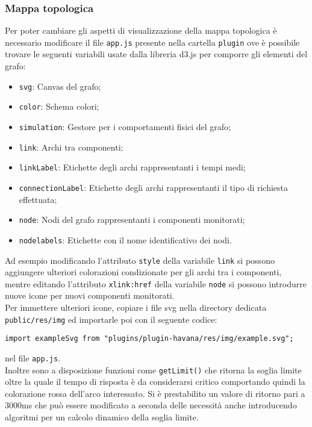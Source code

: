 \subsubsection{Mappa topologica}
\label{sec:graph}
Per poter cambiare gli aspetti di visualizzazione della mappa topologica è necessario modificare il file \texttt{app.js} presente nella cartella \texttt{plugin} ove è possibile trovare le seguenti variabili usate dalla libreria d3.js per comporre gli elementi del grafo:
\begin{itemize}
	\item \texttt{svg}: Canvas del grafo;
	\item \texttt{color}: Schema colori;
	\item \texttt{simulation}: Gestore per i comportamenti fisici del grafo;
	\item \texttt{link}: Archi tra componenti;
	\item \texttt{linkLabel}: Etichette degli archi rappresentanti i tempi medi;
	\item \texttt{connectionLabel}: Etichette degli archi rappresentanti il tipo di richiesta effettuata;
	\item \texttt{node}: Nodi del grafo rappresentanti i componenti monitorati;
	\item \texttt{nodelabels}: Etichette con il nome identificativo dei nodi.
\end{itemize}
Ad esempio modificando l'attributo \texttt{style} della variabile \texttt{link} si possono aggiungere ulteriori colorazioni condizionate per gli archi tra i componenti, mentre editando l'attributo \texttt{xlink:href} della variabile \texttt{node} si possono introdurre nuove icone per nuovi componenti monitorati. \\
Per immettere ulteriori icone, copiare i file svg nella directory dedicata \texttt{public/res/img} ed importarle poi con il seguente codice:
\begin{lstlisting}
import exampleSvg from "plugins/plugin-havana/res/img/example.svg";
\end{lstlisting}
nel file \texttt{app.js}.\\
Inoltre sono a disposizione funzioni come \texttt{getLimit()} che ritorna la soglia limite oltre la quale il tempo di risposta è da considerarsi critico comportando quindi la colorazione rossa dell'arco interessato. 
Si è prestabilito un valore di ritorno pari a 3000ms che può essere modificato a seconda delle necessità anche introducendo algoritmi per un calcolo dinamico della soglia limite. \\
